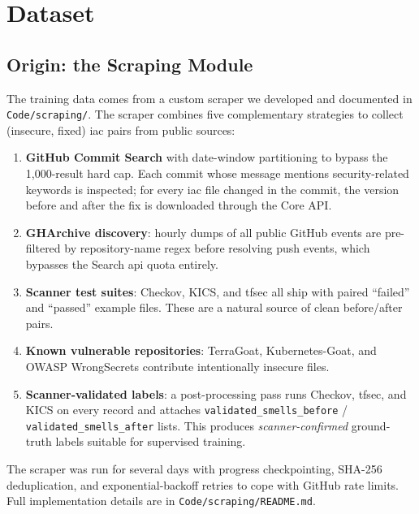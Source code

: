 \documentclass[12pt, a4paper]{report}
\begin{document}
\chapter{Dataset}
\label{ch:dataset}

\section{Origin: the Scraping Module}

The training data comes from a custom scraper we developed and documented
in \texttt{Code/scraping/}. The scraper combines five complementary
strategies to collect (insecure, fixed) \gls{iac} pairs from public sources:

\begin{enumerate}
  \item \textbf{GitHub Commit Search} with date-window partitioning to
        bypass the 1{,}000-result hard cap. Each commit whose message
        mentions security-related keywords is inspected; for every
        \gls{iac} file changed in the commit, the version before and
        after the fix is downloaded through the Core API.
  \item \textbf{GHArchive discovery}: hourly dumps of all public GitHub
        events are pre-filtered by repository-name regex before resolving
        push events, which bypasses the Search \gls{api} quota entirely.
  \item \textbf{Scanner test suites}: Checkov, KICS, and tfsec all ship
        with paired ``failed'' and ``passed'' example files. These are a
        natural source of clean before/after pairs.
  \item \textbf{Known vulnerable repositories}: TerraGoat,
        Kubernetes-Goat, and OWASP WrongSecrets contribute
        intentionally insecure files.
  \item \textbf{Scanner-validated labels}: a post-processing pass runs
        Checkov, tfsec, and KICS on every record and attaches
        \texttt{validated\_smells\_before} / \texttt{validated\_smells\_after}
        lists. This produces \emph{scanner-confirmed} ground-truth labels
        suitable for supervised training.
\end{enumerate}

The scraper was run for several days with progress checkpointing,
SHA-256 deduplication, and exponential-backoff retries to cope with
GitHub rate limits. Full implementation details are in
\texttt{Code/scraping/README.md}.
\end{document}
